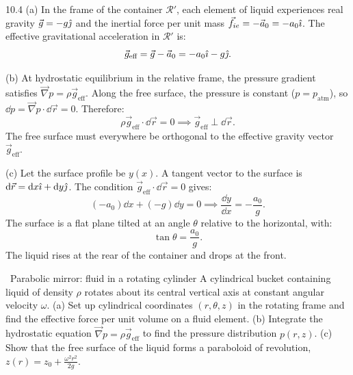 \begin{tabletworkspace}[5.5cm]
\end{tabletworkspace}

\begin{solution}{10.4}
(a) In the frame of the container $\mathcal{R}'$, each element of liquid experiences real gravity $\vec{g} = -g\hat{\jmath}$ and the inertial force per unit mass $\vec{f}_{ie} = -\vec{a}_0 = -a_0\hat{\imath}$.
The effective gravitational acceleration in $\mathcal{R}'$ is:
\[
\vec{g}_{\text{eff}} = \vec{g} - \vec{a}_0 = -a_0\hat{\imath} - g\hat{\jmath}.
\]

(b) At hydrostatic equilibrium in the relative frame, the pressure gradient satisfies $\vec{\nabla} p = \rho\vec{g}_{\text{eff}}$.
Along the free surface, the pressure is constant ($p = p_{\text{atm}}$), so $\dd p = \vec{\nabla} p\cdot\dd\vec{r} = 0$.
Therefore:
\[
\rho\vec{g}_{\text{eff}}\cdot\dd\vec{r} = 0 \implies \vec{g}_{\text{eff}}\perp\dd\vec{r}.
\]
The free surface must everywhere be orthogonal to the effective gravity vector $\vec{g}_{\text{eff}}$.

(c) Let the surface profile be $y(x)$. A tangent vector to the surface is $\mathrm{d}\vec{r} = \mathrm{d} x\hat{\imath} + \mathrm{d} y\hat{\jmath}$. The condition $\vec{g}_{\text{eff}}\cdot\dd\vec{r} = 0$ gives:
\[
(-a_0)\dd x + (-g)\dd y = 0 \implies \frac{\dd y}{\dd x} = -\frac{a_0}{g}.
\]
The surface is a flat plane tilted at an angle $\theta$ relative to the horizontal, with:
\[
\boxed{\tan\theta = \frac{a_0}{g}.}
\]
The liquid rises at the rear of the container and drops at the front.
\end{solution}

\begin{exercise}{\core\ Parabolic mirror: fluid in a rotating cylinder}
A cylindrical bucket containing liquid of density $\rho$ rotates about its central vertical axis at constant angular velocity $\omega$.
(a) Set up cylindrical coordinates $(r, \theta, z)$ in the rotating frame and find the effective force per unit volume on a fluid element.
(b) Integrate the hydrostatic equation $\vec{\nabla} p = \rho\vec{g}_{\text{eff}}$ to find the pressure distribution $p(r, z)$.
(c) Show that the free surface of the liquid forms a paraboloid of revolution, $z(r) = z_0 + \frac{\omega^2 r^2}{2g}$.
\end{exercise}

\begin{tabletworkspace}[6.0cm]
\end{tabletworkspace}

